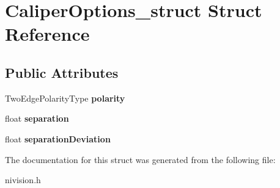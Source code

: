 \hypertarget{structCaliperOptions__struct}{
\section{CaliperOptions\_\-struct Struct Reference}
\label{structCaliperOptions__struct}
}
\subsection*{Public Attributes}
\begin{DoxyCompactItemize}
\item 
\hypertarget{structCaliperOptions__struct_a0c35e144c1657d3224c347932fe9f7d3}{
TwoEdgePolarityType {\bfseries polarity}}
\label{structCaliperOptions__struct_a0c35e144c1657d3224c347932fe9f7d3}

\item 
\hypertarget{structCaliperOptions__struct_a5e2a5f0664f28530b5e13bc8efc39d6d}{
float {\bfseries separation}}
\label{structCaliperOptions__struct_a5e2a5f0664f28530b5e13bc8efc39d6d}

\item 
\hypertarget{structCaliperOptions__struct_ab3bf247080c3d2e3b713ffdfbb169b98}{
float {\bfseries separationDeviation}}
\label{structCaliperOptions__struct_ab3bf247080c3d2e3b713ffdfbb169b98}

\end{DoxyCompactItemize}


The documentation for this struct was generated from the following file:\begin{DoxyCompactItemize}
\item 
nivision.h\end{DoxyCompactItemize}
